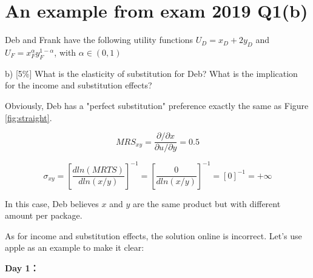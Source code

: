 \documentclass{article}
\begin{document}
\section{An example from exam 2019 Q1(b)}

Deb and Frank have the following utility functions
$U_D = x_D + 2y_D$ and $U_F = x^\alpha_Fy^{1-\alpha}_F$, with $\alpha \in (0,1)$

b) [5\%] What is the elasticity of substitution for Deb? What is the
implication for the income and substitution effects?

\vspace{2mm}

\begin{mdframed}[backgroundcolor=blue!20,linecolor=white]

Obviously, Deb has a "perfect substitution" preference exactly the same as Figure \ref{fig:straight}.

$$MRS_{xy} = \frac{\partial / \partial x}{\partial u / \partial y} = 0.5$$

$$\sigma_{xy} = [\frac{d ln(MRTS)}{d ln(x/y)}]^{-1} = [\frac{0}{d ln(x/y)}]^{-1}=[0]^{-1} = + \infty$$

In this case, Deb believes $x$ and $y$ are the same product but with different amount per package. 

As for income and substitution effects, the solution online is incorrect.
Let's use apple as an example to make it clear:

\vspace{2mm}

\textbf{Day 1：}

\begin{center}
\label{fig:fair}
\end{center}
\vspace{2mm}


\end{mdframed}
\end{document}
